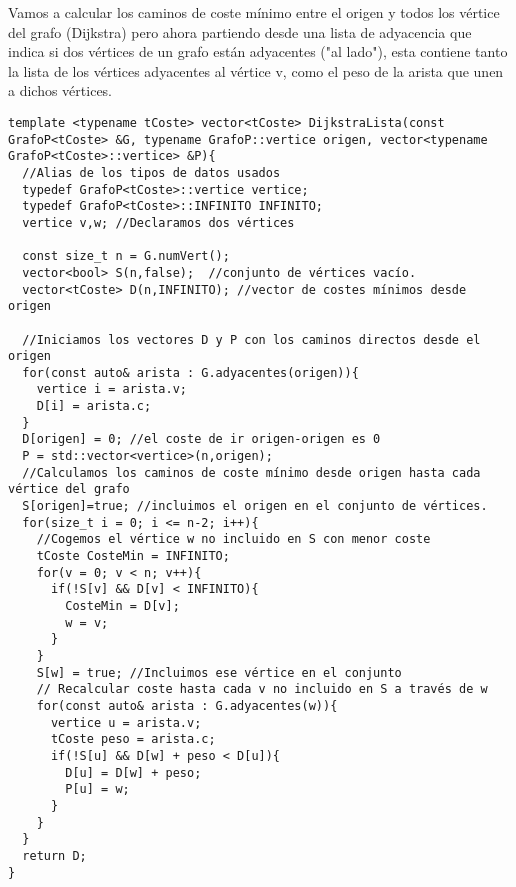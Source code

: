 Vamos a calcular los caminos de coste mínimo entre el origen y todos los vértice del grafo (Dijkstra) pero ahora partiendo desde una lista de adyacencia que indica si dos vértices de un grafo están adyacentes ("al lado"), esta contiene tanto la lista de los vértices adyacentes al vértice v, como el peso de la arista que unen a dichos vértices.
\begin{verbatim}
template <typename tCoste> vector<tCoste> DijkstraLista(const GrafoP<tCoste> &G, typename GrafoP::vertice origen, vector<typename GrafoP<tCoste>::vertice> &P){
  //Alias de los tipos de datos usados
  typedef GrafoP<tCoste>::vertice vertice;
  typedef GrafoP<tCoste>::INFINITO INFINITO;
  vertice v,w; //Declaramos dos vértices

  const size_t n = G.numVert();
  vector<bool> S(n,false);  //conjunto de vértices vacío.
  vector<tCoste> D(n,INFINITO); //vector de costes mínimos desde origen

  //Iniciamos los vectores D y P con los caminos directos desde el origen
  for(const auto& arista : G.adyacentes(origen)){
    vertice i = arista.v;
    D[i] = arista.c;
  }
  D[origen] = 0; //el coste de ir origen-origen es 0
  P = std::vector<vertice>(n,origen);
  //Calculamos los caminos de coste mínimo desde origen hasta cada vértice del grafo
  S[origen]=true; //incluimos el origen en el conjunto de vértices.
  for(size_t i = 0; i <= n-2; i++){
    //Cogemos el vértice w no incluido en S con menor coste
    tCoste CosteMin = INFINITO;
    for(v = 0; v < n; v++){
      if(!S[v] && D[v] < INFINITO){
        CosteMin = D[v];
        w = v;
      }
    }
    S[w] = true; //Incluimos ese vértice en el conjunto
    // Recalcular coste hasta cada v no incluido en S a través de w
    for(const auto& arista : G.adyacentes(w)){
      vertice u = arista.v;
      tCoste peso = arista.c;
      if(!S[u] && D[w] + peso < D[u]){
        D[u] = D[w] + peso;
        P[u] = w;
      }
    }
  }
  return D;
}
\end{verbatim}